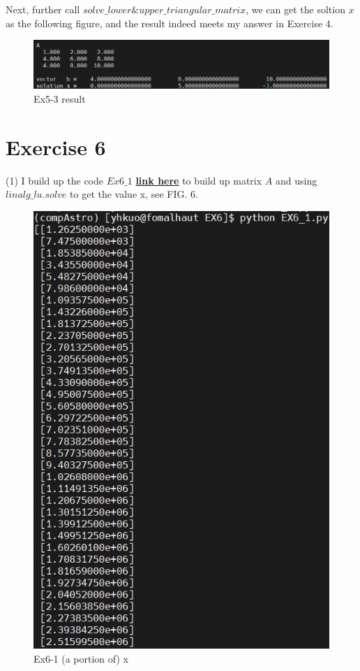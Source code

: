 \documentclass[aps,12pt,prd,nofootinbib,bibnotes, amsmath,amssymb,showpacs,superscriptaddress,floatfix]{revtex4-2}
\begin{document}
Next, further call $solve \_ lower \& upper \_ triangular \_ matrix$, we can get the soltion $x$ as the following figure, and the result indeed meets my answer in Exercise 4.

\begin{figure}
	\centering
	\includegraphics[width=1.0\textwidth]{EX5_3}
	\caption{Ex5-3 result}
\end{figure}
\section{Exercise 6}
(1) I build up the code $Ex6 \_ 1$ \href{https://github.com/kuo1235/Computational-Astrophysics-2022/blob/main/astr660/Homework/HW3/EX6/EX6_1.py}{\bf{link here}} to build up matrix $A$ and using $linalg \_ lu.solve$ to get the value x, see FIG. 6. 
\begin{figure}
	\centering
	\includegraphics[width=1.0\textwidth]{EX6_1}
	\caption{Ex6-1 (a portion of) x}
\end{figure}
\end{document}
